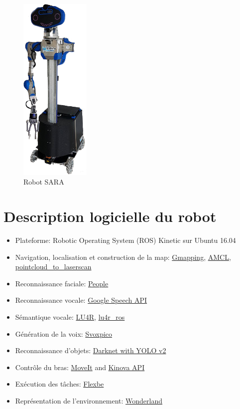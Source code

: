 \begin{figure}
	\centering
	\includegraphics[width=0.30\textwidth]{images/sara_2.png}
	\caption{Robot SARA}
\end{figure}
\section*{Description logicielle du robot}



\begin{itemize}
	\item Plateforme: Robotic Operating System (ROS) Kinetic sur Ubuntu 16.04
	\item Navigation, localisation et construction de la map: \href{http://wiki.ros.org/gmapping}{Gmapping}, \href{http://wiki.ros.org/amcl}{AMCL}, \href{http://wiki.ros.org/pointcloud_to_laserscan}{pointcloud\_to\_laserscan}
	\item Reconnaissance faciale: \href{http://wiki.ros.org/people}{People}
	\item Reconnaissance vocale: \href{https://github.com/WalkingMachine/lab_ros_speech_to_text}{Google Speech API}
	\item Sémantique vocale: \href{http://sag.art.uniroma2.it/lu4r.html}{LU4R}, \href{https://github.com/WalkingMachine/lu4r_ros}{lu4r\_ros}
	\item Génération de la voix: \href{https://doc.ubuntu-fr.org/svoxpico}{Svoxpico}
	\item Reconnaissance d'objets: \href{https://github.com/WalkingMachine/wm_darknet}{Darknet with YOLO v2 }
	\item Contrôle du bras: \href{http://wiki.ros.org/moveit}{MoveIt} and \href{https://github.com/Kinovarobotics/kinova-ros}{Kinova API}
	\item Exécution des tâches: \href{http://wiki.ros.org/flexbe}{Flexbe} 
	\item Représentation de l'environnement: \href{http://github.com/walkingmachine/wonderland}{Wonderland}
\end{itemize}